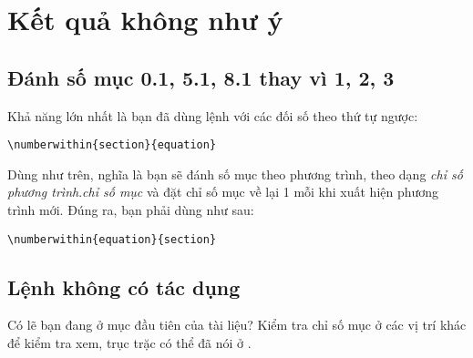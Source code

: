 \section{Kết quả không như ý}


\subsection{Đánh số mục 0.1, 5.1, 8.1 thay vì 1, 2, 3}

\label{numinverse}
Khả năng lớn nhất là bạn đã dùng lệnh 
với các đối số theo thứ tự ngược:
\begin{verbatim}
\numberwithin{section}{equation}
\end{verbatim}
Dùng như trên, nghĩa là bạn sẽ đánh số mục theo phương trình,
theo dạng \textit{chỉ số phương trình}.\textit{chỉ số mục}
và đặt chỉ số mục về lại 1 mỗi khi xuất hiện phương trình mới.
Đúng ra, bạn phải dùng như sau:
\begin{verbatim}
\numberwithin{equation}{section}
\end{verbatim}

\subsection{Lệnh  không có tác dụng}

Có lẽ bạn đang ở mục đầu tiên của tài liệu? Kiểm tra chỉ số mục ở các vị 
trí khác để kiểm tra xem, trục trặc có thể đã nói ở .

